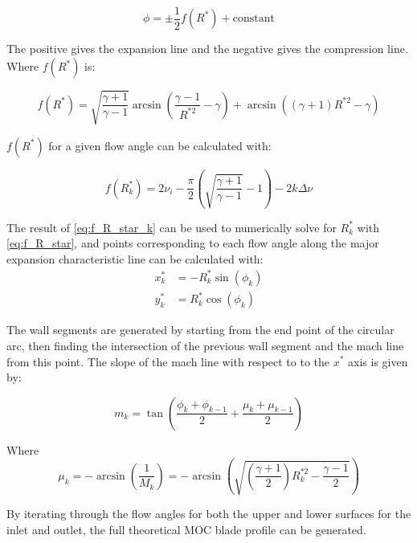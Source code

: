 \begin{equation}
    \phi = \pm \frac{1}{2}f(R^*) + \textrm{constant}
    \label{eq:characteristic_line_equation}
\end{equation}

The positive gives the expansion line and the negative gives the compression line. Where $f(R^*)$ is:

\begin{equation}
    f(R^*) = \sqrt{\frac{\gamma + 1}{\gamma - 1}}\arcsin\left(\frac{\gamma-1}{R^{*2}} - \gamma\right) + \arcsin\left(\left(\gamma+1\right)R^{*2} - \gamma\right)
    \label{eq:f_R_star}
\end{equation}

$f(R^*)$ for a given flow angle can be calculated with:

\begin{equation}
    f(R^*_k) = 2\nu_i - \frac{\pi}{2}\left(\sqrt{\frac{\gamma+1}{\gamma-1}} - 1\right) - 2k\Delta\nu
    \label{eq:f_R_star_k}
\end{equation}

The result of \cref{eq:f_R_star_k} can be used to numerically solve for $R^*_k$ with \cref{eq:f_R_star}, and points corresponding to each flow angle along the major expansion characteristic line can be calculated with:
\begin{equation}
    \begin{aligned}
    x^*_{k} & = -R^*_k \sin(\phi_k) \\
    y^*_{k} & = R^*_k \cos(\phi_k)
    \end{aligned}
\end{equation}

The wall segments are generated by starting from the end point of the circular arc, then finding the intersection of the previous wall segment and the mach line from this point. The slope of the mach line with respect to to the $x^*$ axis is given by:

\begin{equation}
    m_k = \tan\left(\frac{\phi_k+\phi_{k-1}}{2}+\frac{\mu_k+\mu_{k-1}}{2}\right)
\end{equation}

Where
\begin{equation}
    \mu_k = -\arcsin\left(\frac{1}{M_k}\right) = -\arcsin\left(\sqrt{\left(\frac{\gamma+1}{2}\right)R^{*2}_k - \frac{\gamma-1}{2}}\right)
\end{equation}

By iterating through the flow angles for both the upper and lower surfaces for the inlet and outlet, the full theoretical MOC blade profile can be generated.

